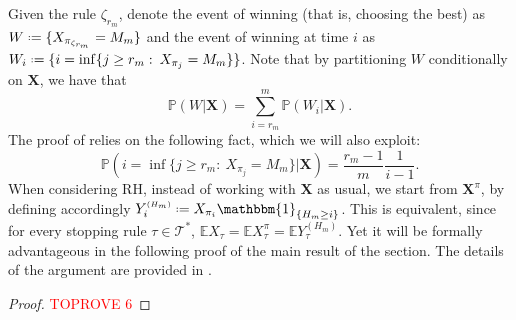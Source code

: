 \documentclass[11pt, a4paper, twoside]{article}
\newcommand*{\defeq}{\mathrel{\vcenter{\baselineskip0.5ex \lineskiplimit0pt
			\hbox{\scriptsize.}\hbox{\scriptsize.}}}=}
\newcommand{\ssup}[1]{{\scriptscriptstyle{({#1})}}}
\newcommand{\EE}{\mathbb{E}}
\newcommand{\PP}{\mathbb{P}}
\newcommand{\TT}{\mathcal{T}}
\newcommand{\XX}{\mathbf{X}}
\newcommand{\II}{\mathbbm{1}}
\numberwithin{equation}{section}
\begin{document}
	Given the rule $\zeta_{r_m}$, denote the event of winning (that is, choosing the best) as $W\defeq\{X_{\pi_{\zeta_{r_m}}}=M_m\}$ and the event of winning at time $i$ as $W_i\defeq \{i=\inf\{j\ge r_m:\:X_{\pi_j}=M_m\}\}$. Note that by partitioning $W$ conditionally on $\XX$, 
	we have that 
	\begin{equation}\label{W}
		\PP(W|\XX)=\sum_{i=r_m}^m \PP(W_i|\XX).
	\end{equation}
The proof of  relies on the following fact, which we will also exploit:
	\begin{equation}\label{W_i}
		\PP\left(i=\inf\{j\ge r_m:\:X_{\pi_j}=M_m\}|\XX\right)=\frac{r_m-1}{m}\frac{1}{i-1}.
	\end{equation}   
When considering RH, instead of working with $\XX$ as usual, we start from $\XX^\pi$, by defining accordingly $Y_i^\ssup{H_m}\defeq X_{\pi_i}\II_{\{H_m\ge i\}}$. This is equivalent, since for every stopping rule $\tau\in\TT^*$, $\EE X_\tau=\EE X_\tau^\pi=\EE Y_\tau^{\ssup{H_m}}$. Yet it will be formally advantageous in the following proof of the main result of the section. The details of the argument are provided in .


	\begin{proof}\textcolor{red}{TOPROVE 6}\end{proof}
	
\end{document}
